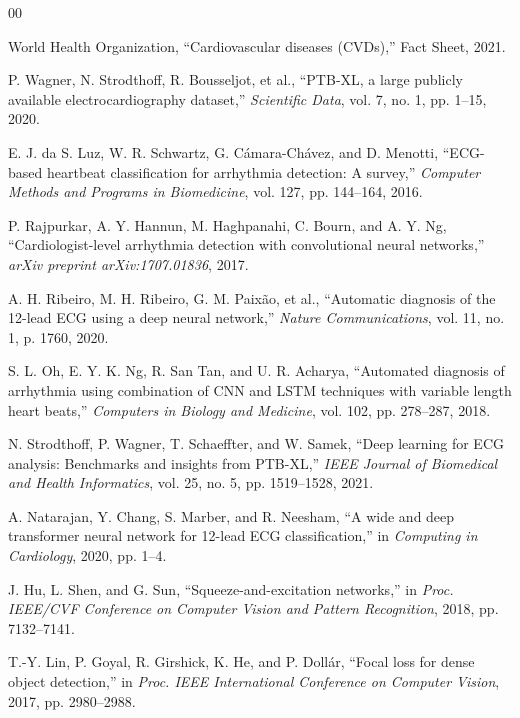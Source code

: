 \documentclass[conference]{IEEEtran}
\begin{document}
\begin{thebibliography}{00}

World Health Organization, ``Cardiovascular diseases (CVDs),'' Fact Sheet, 2021.

P. Wagner, N. Strodthoff, R. Bousseljot, et al., ``PTB-XL, a large publicly available electrocardiography dataset,'' \textit{Scientific Data}, vol. 7, no. 1, pp. 1--15, 2020.

E. J. da S. Luz, W. R. Schwartz, G. C\'amara-Ch\'avez, and D. Menotti, ``ECG-based heartbeat classification for arrhythmia detection: A survey,'' \textit{Computer Methods and Programs in Biomedicine}, vol. 127, pp. 144--164, 2016.

P. Rajpurkar, A. Y. Hannun, M. Haghpanahi, C. Bourn, and A. Y. Ng, ``Cardiologist-level arrhythmia detection with convolutional neural networks,'' \textit{arXiv preprint arXiv:1707.01836}, 2017.

A. H. Ribeiro, M. H. Ribeiro, G. M. Paix\~ao, et al., ``Automatic diagnosis of the 12-lead ECG using a deep neural network,'' \textit{Nature Communications}, vol. 11, no. 1, p. 1760, 2020.

S. L. Oh, E. Y. K. Ng, R. San Tan, and U. R. Acharya, ``Automated diagnosis of arrhythmia using combination of CNN and LSTM techniques with variable length heart beats,'' \textit{Computers in Biology and Medicine}, vol. 102, pp. 278--287, 2018.

N. Strodthoff, P. Wagner, T. Schaeffter, and W. Samek, ``Deep learning for ECG analysis: Benchmarks and insights from PTB-XL,'' \textit{IEEE Journal of Biomedical and Health Informatics}, vol. 25, no. 5, pp. 1519--1528, 2021.

A. Natarajan, Y. Chang, S. Marber, and R. Neesham, ``A wide and deep transformer neural network for 12-lead ECG classification,'' in \textit{Computing in Cardiology}, 2020, pp. 1--4.

J. Hu, L. Shen, and G. Sun, ``Squeeze-and-excitation networks,'' in \textit{Proc. IEEE/CVF Conference on Computer Vision and Pattern Recognition}, 2018, pp. 7132--7141.

T.-Y. Lin, P. Goyal, R. Girshick, K. He, and P. Doll\'ar, ``Focal loss for dense object detection,'' in \textit{Proc. IEEE International Conference on Computer Vision}, 2017, pp. 2980--2988.

\end{thebibliography}
\end{document}
